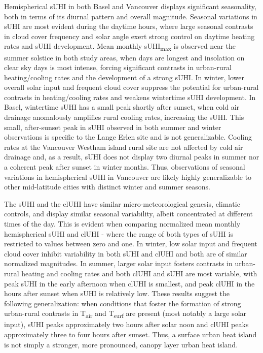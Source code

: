 \begin{bibunit}
Hemispherical sUHI in both Basel and Vancouver displays significant seasonality, both in terms of its diurnal pattern and overall magnitude. Seasonal variations in sUHI are most evident during the daytime hours, where large seasonal contrasts in cloud cover frequency and solar angle exert strong control on daytime heating rates and sUHI development. Mean monthly sUHI\textsubscript{max} is observed near the summer solstice in both study areas, when days are longest and insolation on clear sky days is most intense, forcing significant contrasts in urban-rural heating/cooling rates and the development of a strong sUHI. In winter, lower overall solar input and frequent cloud cover suppress the potential for urban-rural contrasts in heating/cooling rates and weakens wintertime sUHI development. In Basel, wintertime sUHI has a small peak shortly after sunset, when cold air drainage anomalously amplifies rural cooling rates, increasing the sUHI. This small, after-sunset peak in sUHI observed in both summer and winter observations is specific to the Lange Erlen site and is not generalizable. Cooling rates at the Vancouver Westham island rural site are not affected by cold air drainage and, as a result, sUHI does not display two diurnal peaks in summer nor a coherent peak after sunset in winter months. Thus, observations of seasonal variations in hemispherical sUHI in Vancouver are likely highly generalizable to other mid-latitude cities with distinct winter and summer seasons. 

The sUHI and the clUHI have similar micro-meteorological genesis, climatic controls, and display similar seasonal variability, albeit concentrated at different times of the day. This is evident when comparing normalized mean monthly hemispherical sUHI and clUHI - where the range of both types of sUHI is restricted to values between zero and one. In winter, low solar input and frequent cloud cover inhibit variability in both sUHI and clUHI and both are of similar normalized magnitudes. In summer, larger solar input fosters contrasts in urban-rural heating and cooling rates and both clUHI and sUHI are most variable, with peak sUHI in the early afternoon when clUHI is smallest, and peak clUHI in the hours after sunset when sUHI is relatively low. These results suggest the following generalization: when conditions that foster the formation of strong urban-rural contrasts in T\textsubscript{air} and T\textsubscript{surf} are present (most notably a large solar input), sUHI peaks approximately two hours after solar noon and clUHI peaks approximately three to four hours after sunset. Thus, a surface urban heat island is not simply a stronger, more pronounced, canopy layer urban heat island. 


\end{bibunit}
